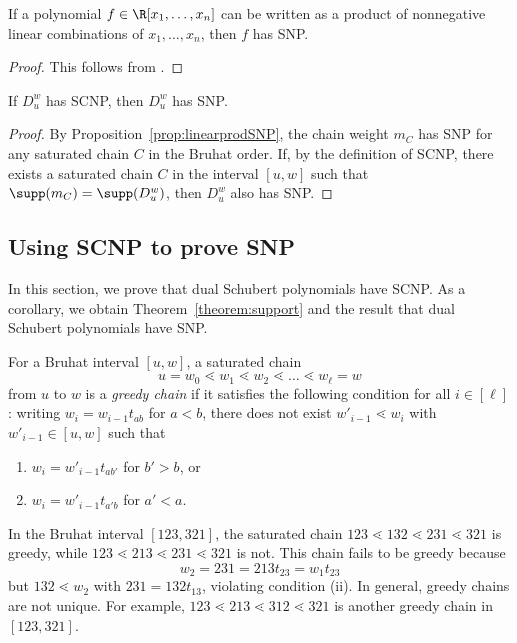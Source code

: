 \begin{prop}\label{prop:linearprodSNP}
    If a polynomial $f\in \R[x_1,\dots,x_n]$ can be written as a product of nonnegative linear combinations of $x_1, \dots, x_n$, then $f$ has SNP.
\end{prop}

\begin{proof}
    This follows from \cite[Theorem 3.4]{2009minkowski}.
\end{proof}


\begin{prop}\label{prop:SCNPtoSNP}
    If $D_u^w$ has SCNP, then $D_u^w$ has SNP.
\end{prop}
\begin{proof}
    By Proposition~\ref{prop:linearprodSNP}, the chain weight $m_C$ has SNP for any saturated chain $C$ in the Bruhat order. If, by the definition of SCNP, there exists a saturated chain $C$ in the interval $[u, w]$ such that $\supp(m_C) = \supp(D_u^w)$, then $D_u^w$ also has SNP.
\end{proof}



\subsection{Using SCNP to prove SNP}\label{subsec:dualschubSCNP}

In this section, we prove that dual Schubert polynomials have SCNP. As a corollary, we obtain Theorem~\ref{theorem:support} and the result that dual Schubert polynomials have SNP. 

\begin{defi}
    For a Bruhat interval $[u,w]$, a saturated chain 
    \[u = w_0\lessdot w_1\lessdot w_2\lessdot \dots \lessdot w_{\ell} = w\] 
    from $u$ to $w$ is a \emph{greedy chain} if it satisfies the following condition for all $i\in [\ell]$: writing $w_{i}=w_{i-1}t_{ab}$ for $a < b$, there does not exist $w'_{i-1}\lessdot w_{i}$ with $w'_{i-1} \in [u,w]$ such that 
    \begin{enumerate}[label=\textnormal{(\roman*)}]
        \item $w_{i}=w'_{i-1}t_{ab'}$ for $b'>b$, or
        \item $w_{i}=w'_{i-1}t_{a'b}$ for $a'<a$.
    \end{enumerate}
\end{defi}

\begin{exam}
    In the Bruhat interval $[123, 321]$, the saturated chain $123 \lessdot 132\lessdot 231 \lessdot 321$ is greedy, while $123 \lessdot 213 \lessdot 231 \lessdot 321$ is not. This chain fails to be greedy because \[w_2 = 231 = 213t_{23} = w_{1}t_{23}\] but $132 \lessdot w_2$ with $231 = 132t_{13}$, violating condition (ii). In general, greedy chains are not unique. For example, $123 \lessdot 213 \lessdot 312 \lessdot 321$ is another greedy chain in $[123,321]$.
\end{exam}

